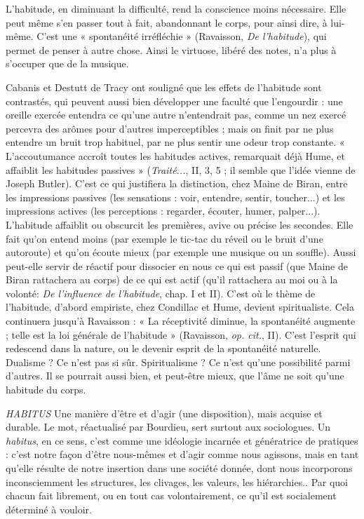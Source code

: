 L'habitude, en diminuant la difficulté, rend la conscience moins nécessaire.
Elle peut même s’en passer tout à fait, abandonnant le corps, pour ainsi dire, à
lui-même. C’est une « spontanéité irréfléchie » (Ravaisson, {\it De l'habitude}), qui
permet de penser à autre chose. Ainsi le virtuose, libéré des notes, n’a plus à
s’occuper que de la musique.

Cabanis et Destutt de Tracy ont souligné que les effets de l’habitude sont
contrastés, qui peuvent aussi bien développer une faculté que l’engourdir : une
oreille exercée entendra ce qu’une autre n’entendrait pas, comme un nez exercé
percevra des arômes pour d’autres imperceptibles ; mais on finit par ne plus
entendre un bruit trop habituel, par ne plus sentir une odeur trop constante.
« L’accoutumance accroît toutes les habitudes actives, remarquait déjà Hume,
et affaiblit les habitudes passives » ({\it Traité...}, II, 3, 5 ; il semble que l’idée
vienne de Joseph Butler). C’est ce qui justifiera la distinction, chez Maine de
Biran, entre les impressions passives (les sensations : voir, entendre, sentir, toucher...)
et les impressions actives (les perceptions : regarder, écouter, humer,
palper...). L'habitude affaiblit ou obscurcit les premières, avive ou précise les
secondes. Elle fait qu’on entend moins (par exemple le tic-tac du réveil ou le
bruit d’une autoroute) et qu’on écoute mieux (par exemple une musique ou un
souffle). Aussi peut-elle servir de réactif pour dissocier en nous ce qui est passif
(que Maine de Biran rattachera au corps) de ce qui est actif (qu’il rattachera au
moi ou à la volonté: {\it De l'influence de l'habitude}, chap. I et II). C’est où le
thème de l’habitude, d’abord empiriste, chez Condillac et Hume, devient spiritualiste.
Cela continuera jusqu’à Ravaisson : « La réceptivité diminue, la
spontanéité augmente ; telle est la loi générale de l'habitude » (Ravaisson,
{\it op. cit.}, II). C’est l’esprit qui redescend dans la nature, ou le devenir esprit de la
spontanéité naturelle. Dualisme ? Ce n’est pas si sûr. Spiritualisme ? Ce n’est
qu’une possibilité parmi d’autres. Il se pourrait aussi bien, et peut-être mieux,
que l’âme ne soit qu’une habitude du corps.

{\it HABITUS} Une manière d’être et d’agir (une disposition), mais acquise et
durable. Le mot, réactualisé par Bourdieu, sert surtout aux
sociologues. Un {\it habitus}, en ce sens, c’est comme une idéologie incarnée et
génératrice de pratiques : c’est notre façon d’être nous-mêmes et d’agir comme
nous agissons, mais en tant qu’elle résulte de notre insertion dans une société
donnée, dont nous incorporons inconsciemment les structures, les clivages, les
valeurs, les hiérarchies.. Par quoi chacun fait librement, ou en tout cas volontairement,
ce qu’il est socialement déterminé à vouloir.

